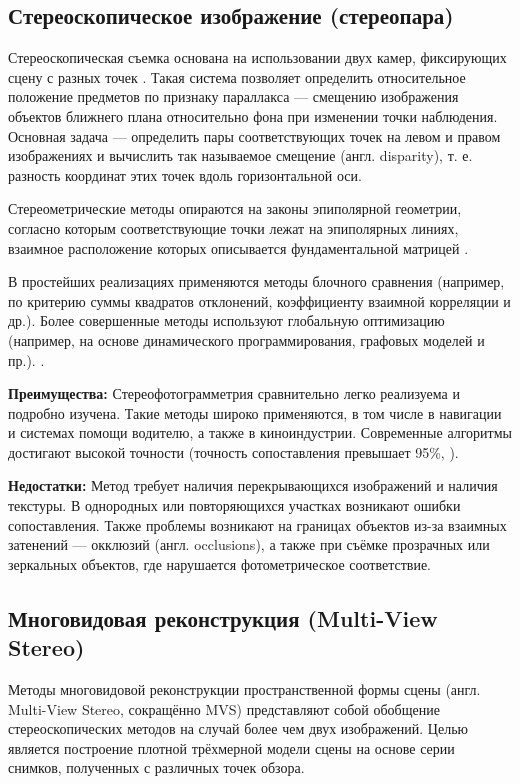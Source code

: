 \subsection{Стереоскопическое изображение (стереопара)}

Стереоскопическая съемка  основана на использовании двух камер, фиксирующих
сцену с разных точек \cite{ussr1981phototech}.  Такая система позволяет
определить относительное положение предметов по признаку параллакса — смещению
изображения объектов ближнего плана относительно фона при изменении точки
наблюдения.  Основная задача — определить пары соответствующих точек на левом и
правом изображениях и вычислить так называемое смещение (англ.  disparity), т.
е.  разность координат этих точек вдоль горизонтальной оси.

Стереометрические методы опираются на законы эпиполярной геометрии,
согласно которым соответствующие точки лежат на эпиполярных линиях, взаимное
расположение которых описывается фундаментальной матрицей \cite{Hartley:2003:MVG:861369}.

В простейших реализациях применяются методы блочного сравнения (например, по
критерию суммы квадратов отклонений, коэффициенту взаимной корреляции и др.).
Более совершенные методы используют глобальную оптимизацию (например, на основе
динамического программирования, графовых моделей и пр.). \cite{kok2019reviewonsterevision}.

\textbf{Преимущества:} Стереофотограмметрия сравнительно легко реализуема и
подробно изучена. Такие методы широко применяются, в том числе в навигации и
системах помощи водителю, а также в киноиндустрии. Современные алгоритмы
достигают высокой точности (точность сопоставления превышает 95\%,
\cite{fsian2022comparisonstereomatchingalgorithms}).

\textbf{Недостатки:} Метод требует наличия перекрывающихся изображений и
наличия текстуры. В однородных или повторяющихся участках возникают ошибки
сопоставления. Также проблемы возникают на границах объектов из-за взаимных
затенений — окклюзий (англ. occlusions), а также при съёмке прозрачных или
зеркальных объектов, где нарушается фотометрическое соответствие.

\subsection{Многовидовая реконструкция (Multi-View Stereo)}

Методы многовидовой реконструкции пространственной формы сцены (англ.
Multi-View Stereo, сокращённо MVS) представляют собой обобщение
стереоскопических методов на случай более чем двух изображений. Целью
является построение плотной трёхмерной модели сцены на основе серии снимков,
полученных с различных точек обзора.


